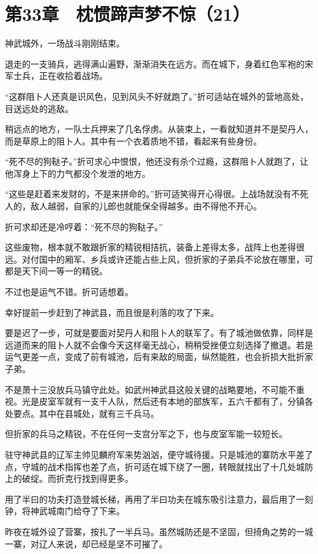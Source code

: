\section{第33章　枕惯蹄声梦不惊（21）}

神武城外，一场战斗刚刚结束。

退走的一支骑兵，逃得满山遍野，渐渐消失在远方。而在城下，身着红色军袍的宋军士兵，正在收拾着战场。

“这群阻卜人还真是识风色，见到风头不好就跑了。”折可适站在城外的营地高处，目送远处的逃敌。

稍远点的地方，一队士兵押来了几名俘虏。从装束上，一看就知道并不是契丹人，而是草原上的阻卜人。其中有一个衣着质地不错，看起来有些身份。

“死不尽的狗鞑子。”折可求心中恨恨，他还没有杀个过瘾，这群阻卜人就跑了，让他浑身上下的力气都没个发泄的地方。

“这些是赶着来发财的，不是来拼命的。”折可适笑得开心得很。上战场就没有不死人的，敌人越弱，自家的儿郎也就能保全得越多。由不得他不开心。

折可求却还是冷哼着：“死不尽的狗鞑子。”

这些废物，根本就不敢跟折家的精锐相拮抗，装备上差得太多，战阵上也差得很远。对付国中的厢军、乡兵或许还能占些上风，但折家的子弟兵不论放在哪里，可都是天下间一等一的精锐。

不过也是运气不错。折可适想着。

幸好提前一步赶到了神武县，而且很是利落的攻了下来。

要是迟了一步，可就是要面对契丹人和阻卜人的联军了。有了城池做依靠，同样是远道而来的阻卜人就不会像今天这样毫无战心，稍稍受挫便立刻选择了撤退。若是运气更差一点，变成了前有城池，后有来敌的局面，纵然能胜，也会折损大批折家子弟。

不是萧十三没放兵马镇守此处。如武州神武县这般关键的战略要地，不可能不重视。光是皮室军就有一支千人队，然后还有本地的部族军，五六千都有了，分镇各处要点。其中在县城处，就有三千兵马。

但折家的兵马之精锐，不在任何一支宫分军之下，也与皮室军能一较短长。

驻守神武县的辽军主帅见麟府军来势汹汹，便守城待援。只是城池的寨防水平差了点，守城的战术指挥也差了点，折可适在城下绕了一圈，转眼就找出了十几处城防上的破绽。而折克行找到得更多。

用了半曰的功夫打造登城长梯，再用了半曰功夫在城东吸引注意力，最后用了一刻钟，将神武城南门给夺了下来。

昨夜在城外设了营寨，按扎了一半兵马。虽然城防还是不坚固，但掎角之势的一城一寨，对辽人来说，却已经是坚不可摧了。

